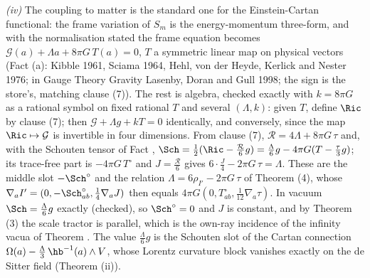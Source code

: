 \emph{(iv)} The coupling to matter is the standard one for the Einstein-Cartan functional: the frame variation of $S_{m}$ is the energy-momentum three-form, and with the normalisation stated the frame equation becomes $\mathcal{G}(a) + \Lambda a + 8\pi G\,T(a) = 0$, $T$ a symmetric linear map on physical vectors (Fact (a): Kibble 1961, Sciama 1964, Hehl, von der Heyde, Kerlick and Nester 1976; in Gauge Theory Gravity Lasenby, Doran and Gull 1998; the sign is the store's, matching clause (7)). The rest is algebra, checked exactly with $k = 8\pi G$ as a rational symbol on fixed rational $T$ and several $(\Lambda, k)$: given $T$, define $\Ric$ by clause (7); then $\mathcal{G} + \Lambda g + kT = 0$ identically, and conversely, since the map $\Ric \mapsto \mathcal{G}$ is invertible in four dimensions. From clause (7), $\mathcal{R} = 4\Lambda + 8\pi G\,\tau$ and, with the Schouten tensor of Fact , $\Sch = \tfrac12(\Ric - \tfrac{\mathcal{R}}{6}g) = \tfrac{\Lambda}{6}g - 4\pi G(T - \tfrac{\tau}{3}g)$; its trace-free part is $-4\pi G\,T^{\circ}$ and $J = \tfrac{\mathcal{R}}{6}$ gives $6\cdot\tfrac{J}{4} - 2\pi G\,\tau = \Lambda$. These are the middle slot $-\Sch^{\circ}$ and the relation $\Lambda = 6\rho_{I'} - 2\pi G\,\tau$ of Theorem (4), whose $\nabla_{a}I' = (0, -\Sch^{\circ}_{ab}, \tfrac14\nabla_{a}J)$ then equals $4\pi G(0, T^{\circ}_{ab}, \tfrac{1}{12}\nabla_{a}\tau)$. In vacuum $\Sch = \tfrac{\Lambda}{6}g$ exactly (checked), so $\Sch^{\circ} = 0$ and $J$ is constant, and by Theorem (3) the scale tractor is parallel, which is the own-ray incidence of the infinity vacua of Theorem . The value $\tfrac{\Lambda}{6}g$ is the Schouten slot of the Cartan connection $\Omega(a) - \tfrac{\Lambda}{3}\,\hb^{-1}(a)\wedge V$, whose Lorentz curvature block vanishes exactly on the de Sitter field (Theorem (ii)).

